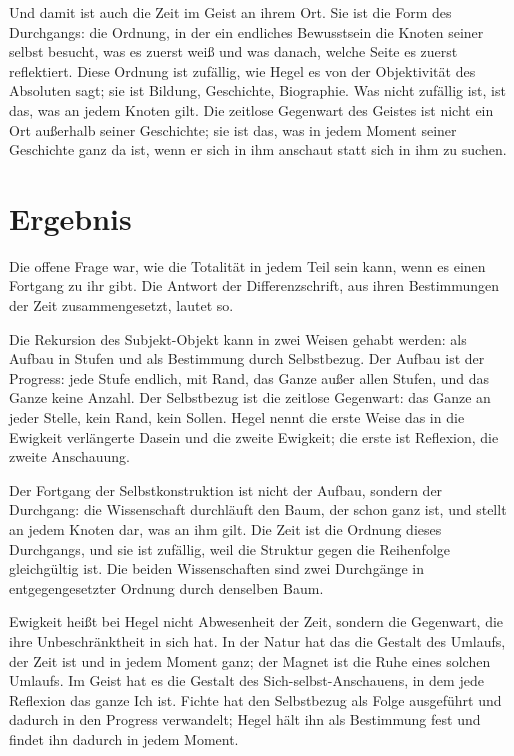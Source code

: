 \documentclass[11pt,a4paper]{article}
\newcommand{\SO}{Subjekt-Objekt}
\begin{document}
Und damit ist auch die Zeit im Geist an ihrem Ort. Sie ist die Form des Durchgangs: die Ordnung, in der ein endliches Bewusstsein die Knoten seiner selbst besucht, was es zuerst weiß und was danach, welche Seite es zuerst reflektiert. Diese Ordnung ist zufällig, wie Hegel es von der Objektivität des Absoluten sagt; sie ist Bildung, Geschichte, Biographie. Was nicht zufällig ist, ist das, was an jedem Knoten gilt. Die zeitlose Gegenwart des Geistes ist nicht ein Ort außerhalb seiner Geschichte; sie ist das, was in jedem Moment seiner Geschichte ganz da ist, wenn er sich in ihm anschaut statt sich in ihm zu suchen.

\section{Ergebnis}

Die offene Frage war, wie die Totalität in jedem Teil sein kann, wenn es einen Fortgang zu ihr gibt. Die Antwort der Differenzschrift, aus ihren Bestimmungen der Zeit zusammengesetzt, lautet so.

Die Rekursion des \SO{} kann in zwei Weisen gehabt werden: als Aufbau in Stufen und als Bestimmung durch Selbstbezug. Der Aufbau ist der Progress: jede Stufe endlich, mit Rand, das Ganze außer allen Stufen, und das Ganze keine Anzahl. Der Selbstbezug ist die zeitlose Gegenwart: das Ganze an jeder Stelle, kein Rand, kein Sollen. Hegel nennt die erste Weise das in die Ewigkeit verlängerte Dasein und die zweite Ewigkeit; die erste ist Reflexion, die zweite Anschauung.

Der Fortgang der Selbstkonstruktion ist nicht der Aufbau, sondern der Durchgang: die Wissenschaft durchläuft den Baum, der schon ganz ist, und stellt an jedem Knoten dar, was an ihm gilt. Die Zeit ist die Ordnung dieses Durchgangs, und sie ist zufällig, weil die Struktur gegen die Reihenfolge gleichgültig ist. Die beiden Wissenschaften sind zwei Durchgänge in entgegengesetzter Ordnung durch denselben Baum.

Ewigkeit heißt bei Hegel nicht Abwesenheit der Zeit, sondern die Gegenwart, die ihre Unbeschränktheit in sich hat. In der Natur hat das die Gestalt des Umlaufs, der Zeit ist und in jedem Moment ganz; der Magnet ist die Ruhe eines solchen Umlaufs. Im Geist hat es die Gestalt des Sich-selbst-Anschauens, in dem jede Reflexion das ganze Ich ist. Fichte hat den Selbstbezug als Folge ausgeführt und dadurch in den Progress verwandelt; Hegel hält ihn als Bestimmung fest und findet ihn dadurch in jedem Moment.
\end{document}
